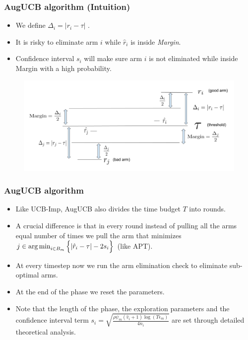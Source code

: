 \begin{frame}
\frametitle{AugUCB algorithm (Intuition)}
\begin{itemize}
\item We define $\Delta_i = |r_i - \tau| $ . 
\item It is risky to eliminate arm $i$ while $\hat{r}_i$ is inside \emph{Margin}. 
\item Confidence interval $s_i$ will make sure arm $i$ is not eliminated while inside Margin with a high probability. 


\end{itemize}

\begin{figure}
\includegraphics[scale=0.278]{img/SeminarThresholdBandit.png}
\end{figure}


\end{frame}

\begin{frame}
\frametitle{AugUCB algorithm}
\begin{itemize}
\item<1-> Like UCB-Imp, AugUCB also divides the time budget $T$ into rounds.
\item<2-> A crucial difference is that in every round instead of pulling all the arms equal number of times we pull the arm that minimizes $j\in\operatorname*{arg\,min}_{i\in B_{m}}\Big\lbrace |\hat{r}_{i} - \tau | - 2s_{i}\Big\rbrace$ (like APT). 
\item<3-> At every timestep now we run the arm elimination check to eliminate sub-optimal arms.
\item<4-> At the end of the phase we reset the parameters. 
\item<5-> Note that the length of the phase, the exploration parameters and the confidence interval term $s_i  = \sqrt{\frac{\rho\psi_m (\hat{v}_{i}+1) \log ( T \epsilon_{m})}{4 n_{i}}}$ are set through detailed theoretical analysis. 
\end{itemize}
\end{frame}

